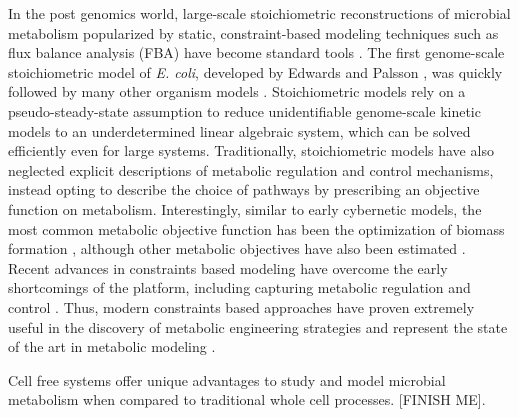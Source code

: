 \documentclass[12pt]{article}
\begin{document}
In the post genomics world, large-scale stoichiometric reconstructions of microbial metabolism popularized by static, constraint-based modeling techniques such as flux balance analysis (FBA)
have become standard tools \citep{2012_lewis_palsson_NatRevMicrobio}.
The first genome-scale stoichiometric model of \textit{E. coli}, developed by Edwards and Palsson \citep{2000_edwards_palsson_PNAS}, 
was quickly followed by many other organism models \citep{2009_feist_palsson_NatRevMicrobio}. 
Stoichiometric models rely on a pseudo-steady-state assumption to reduce unidentifiable genome-scale kinetic models to an underdetermined linear algebraic system, 
which can be solved efficiently even for large systems.  
Traditionally, stoichiometric models have also neglected explicit descriptions of metabolic regulation and control mechanisms, 
instead opting to describe the choice of pathways by prescribing an objective function on metabolism. 
Interestingly, similar to early cybernetic models, the most common metabolic objective function has been the optimization of biomass formation \citep{2002_ibarra_edwards_palsson_Nat}, 
although other metabolic objectives have also been estimated \citep{2007_schuetz_sauer_MolSysBio}. 
Recent advances in constraints based modeling have overcome the early shortcomings of the platform, including capturing metabolic regulation and control \citep{2013_hyduke_lewis_palsson_MolBioSys}.
Thus, modern constraints based approaches have proven extremely useful in the discovery of metabolic engineering strategies and represent the state of the art in metabolic modeling \citep{2013_mccloskey_palsson_feist_MolSysBio, 2012_zomorrodi_maranas_MetaEng}.

Cell free systems offer unique advantages to study and model microbial metabolism when compared to traditional whole cell processes.
[FINISH ME].
\end{document}
